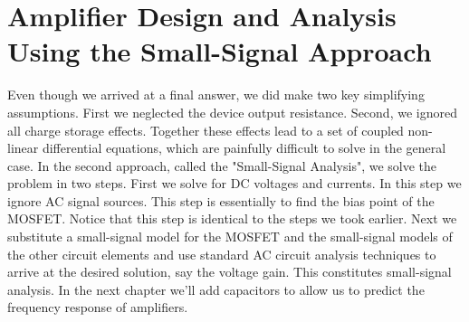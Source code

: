 \section{Amplifier Design and Analysis Using the Small-Signal Approach}
Even though we arrived at a final answer, we did make two key simplifying assumptions.  First we neglected the device output resistance.  Second, we ignored all charge storage effects.  Together these effects lead to a set of coupled non-linear differential equations, which are painfully difficult to solve in the general case.
In the second approach, called the "Small-Signal Analysis", we solve the problem in two steps.  First we solve for DC voltages and currents.  In this step we ignore AC signal sources.  This step is essentially to find the bias point of the MOSFET.  Notice that this step is identical to the steps we took earlier.  Next we substitute a small-signal model for the MOSFET and the small-signal models of the other circuit elements and use standard AC circuit analysis techniques to arrive at the desired solution, say the voltage gain. This constitutes small-signal analysis.  In the next chapter we'll add capacitors to allow us to predict the frequency response of amplifiers.
